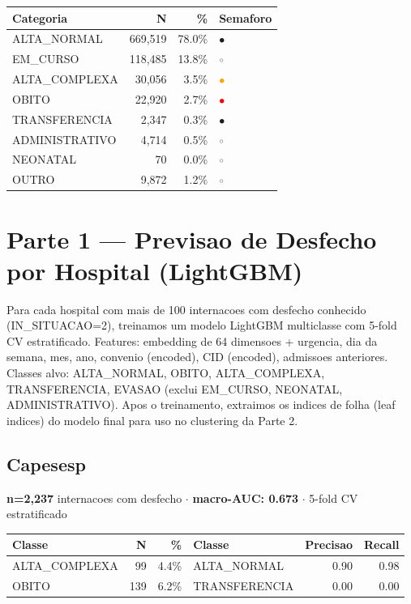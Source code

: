 \documentclass[11pt,a4paper]{article}
\begin{document}
\begin{center}
\begin{tabular}{lrrl}
\toprule
Categoria & N & \% & Semaforo \\
\midrule
\rowcolor{green!20}ALTA\_NORMAL & 669,519 & 78.0\% & \textcolor{green!60!black}{$\bullet$} \\
\rowcolor{blue!10}EM\_CURSO & 118,485 & 13.8\% & \textcolor{gray}{$\circ$} \\
\rowcolor{orange!30}ALTA\_COMPLEXA & 30,056 & 3.5\% & \textcolor{orange}{\textbf{$\bullet$}} \\
\rowcolor{red!30}OBITO & 22,920 & 2.7\% & \textcolor{red}{\textbf{$\bullet$}} \\
\rowcolor{yellow!30}TRANSFERENCIA & 2,347 & 0.3\% & \textcolor{orange!80!black}{$\bullet$} \\
\rowcolor{gray!15}ADMINISTRATIVO & 4,714 & 0.5\% & \textcolor{gray}{$\circ$} \\
\rowcolor{cyan!15}NEONATAL & 70 & 0.0\% & \textcolor{gray}{$\circ$} \\
\rowcolor{gray!10}OUTRO & 9,872 & 1.2\% & \textcolor{gray}{$\circ$} \\
\bottomrule
\end{tabular}
\end{center}
\newpage
\section{Parte 1 --- Previsao de Desfecho por Hospital (LightGBM)}
Para cada hospital com mais de 100 internacoes com desfecho conhecido (IN\_SITUACAO=2), treinamos um modelo LightGBM multiclasse com 5-fold CV estratificado. Features: embedding de 64 dimensoes + urgencia, dia da semana, mes, ano, convenio (encoded), CID (encoded), admissoes anteriores. Classes alvo: ALTA\_NORMAL, OBITO, ALTA\_COMPLEXA, TRANSFERENCIA, EVASAO (exclui EM\_CURSO, NEONATAL, ADMINISTRATIVO). Apos o treinamento, extraimos os indices de folha (leaf indices) do modelo final para uso no clustering da Parte 2.

\subsection{Capesesp}
\textbf{n=2,237} internacoes com desfecho $\cdot$ \textbf{macro-AUC: 0.673} $\cdot$ 5-fold CV estratificado

\begin{tabular}{lrr|lrr}
\toprule
Classe & N & \% & Classe & Precisao & Recall \\
\midrule
ALTA\_COMPLEXA & 99 & 4.4\% & ALTA\_NORMAL & 0.90 & 0.98 \\
OBITO & 139 & 6.2\% & TRANSFERENCIA & 0.00 & 0.00 \\
\bottomrule
\end{tabular}
\end{document}
